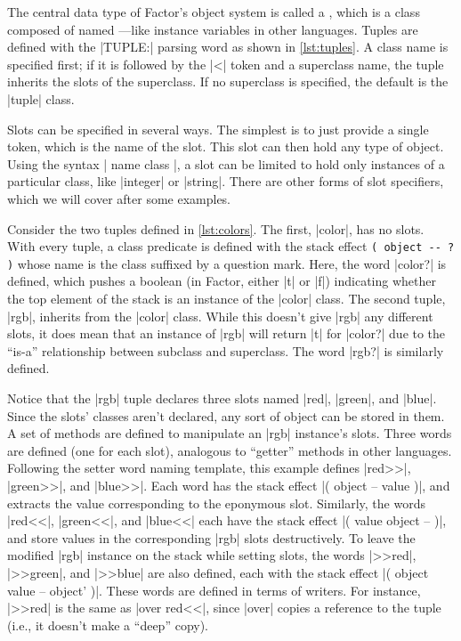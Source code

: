 
The central data type of Factor's object system is called a , which
is a class composed of named ---like instance variables in other
languages.  Tuples are defined with the \factor|TUPLE:| parsing word as shown
in \cref{lst:tuples}.  A class name is specified first; if it is followed by
the \factor|<| token and a superclass name, the tuple inherits the slots of the
superclass.  If no superclass is specified, the default is the \factor|tuple|
class.

Slots can be specified in several ways.  The simplest is to just provide a
single token, which is the name of the slot.  This slot can then hold any type
of object.  Using the syntax
%
\factor|{ name class }|,
%
a slot can be limited to hold only instances of a particular class, like
\factor|integer| or \factor|string|.  There are other forms of slot specifiers,
which we will cover after some examples.


Consider the two tuples defined in \cref{lst:colors}.  The first,
\factor|color|, has no slots.  With every tuple, a class predicate is defined
with the stack effect
%
\verb|( object -- ? )|
%
whose name is the class suffixed by a question mark.  Here, the word
\factor|color?| is defined, which pushes a boolean (in Factor, either
\factor|t| or \factor|f|) indicating whether the top element of the stack is an
instance of the \factor|color| class.  The second tuple, \factor|rgb|, inherits
from the \factor|color| class.  While this doesn't give \factor|rgb| any
different slots, it does mean that an instance of \factor|rgb| will return
\factor|t| for \factor|color?| due to the ``is-a'' relationship between
subclass and superclass.  The word \factor|rgb?| is similarly defined.

Notice that the \factor|rgb| tuple declares three slots named \factor|red|,
\factor|green|, and \factor|blue|.  Since the slots' classes aren't declared,
any sort of object can be stored in them.  A set of methods are defined to
manipulate an \factor|rgb| instance's slots.  Three  words are
defined (one for each slot), analogous to ``getter'' methods in other
languages.  Following the setter word naming template, this example defines
\factor|red>>|, \factor|green>>|, and \factor|blue>>|.  Each word has the stack
effect
%
\factor|( object -- value )|,
%
and extracts the value corresponding to the eponymous slot.  Similarly, the
 words \factor|red<<|, \factor|green<<|, and \factor|blue<<| each
have the stack effect
%
\factor|( value object -- )|,
%
and store values in the corresponding \factor|rgb| slots destructively.  To
leave the modified \factor|rgb| instance on the stack while setting slots, the
 words \factor|>>red|, \factor|>>green|, and \factor|>>blue| are
also defined, each with the stack effect
%
\factor|( object value -- object' )|.
%
These words are defined in terms of writers.  For instance, \factor|>>red| is
the same as \factor|over red<<|, since \factor|over| copies a reference to the
tuple (i.e., it doesn't make a ``deep'' copy).

